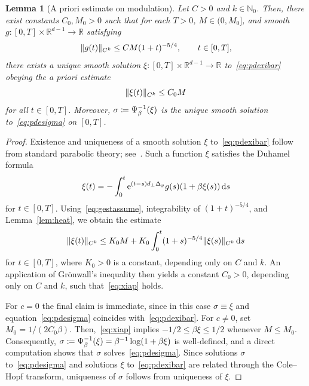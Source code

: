 \documentclass[12pt,oneside,a4paper,reqno]{amsart}
\numberwithin{equation}{section}
\newtheorem{lemma}[theorem]{Lemma}
\theoremstyle{definition}
\theoremstyle{remark}
\newcommand{\bbN}{{\mathbb N}}
\newcommand{\bbR}{{\mathbb R}}
\newcommand{\rd}{{\,\rm{d}}}
\newcommand{\re}{{\rm e}}
\DeclarePairedDelimiter{\norm}{\lVert}{\rVert}
\begin{document}
\begin{lemma}[A priori estimate on modulation]
    \label{lem:xiAP}
Let $C > 0$ and $k \in \bbN_0$. Then, there exist  constants $C_0, M_0 > 0$ such that for each $T > 0$, $M \in (0,M_0]$, and smooth $g \colon [0,T] \times \bbR^{d-1} \to \bbR$ satisfying
\begin{equation}
\label{eq:gestassume}
\norm{g(t)}_{C^k} \leq C M (1+t)^{-5/4}, \qquad t \in [0,T],
  \end{equation}
there exists a unique smooth solution $\xi \colon [0,T] \times \bbR^{d-1} \to \bbR$ to~\eqref{eq:pdexibar}
obeying the a priori estimate
\begin{equation}
\label{eq:xiap}
\norm{\xi(t)}_{C^k} \leq C_0 M
\end{equation}
for all $t \in [0,T]$. 
Moreover, $\sigma \coloneq \smash{\Psi_\beta^{-1}}(\xi)$
is the unique smooth solution to~\eqref{eq:pdesigma} on $[0,T]$.
\end{lemma}
\begin{proof}
Existence and uniqueness of a smooth solution $\xi$ to~\eqref{eq:pdexibar} follow from standard parabolic theory; see~\cite[Chapter~4]{Lunardi_analytic_2013}. Such a function $\xi$ satisfies the Duhamel formula
\begin{align}
    \label{eq:xiduhamellem}
    \xi(t) = -\int_0^t \re^{(t-s)d_{\bot}\Delta_y} g(s)(1+\beta\xi(s))\rd s
\end{align}
for $t \in [0,T]$. Using~\eqref{eq:gestassume}, integrability of $(1+t)^{-5/4}$, and Lemma~\ref{lem:heat}, we obtain the estimate
\begin{equation*}
    \norm{\xi(t)}_{C^k} \leq K_0 M + K_0 \int_0^t (1+s)^{-5/4} \norm{\xi(s)}_{C^k} \rd s
\end{equation*}
for $t \in [0,T]$, where $K_0 > 0$ is a constant, depending only on $C$ and $k$. An application of Gr\"onwall's inequality then yields a constant $C_0 > 0$, depending only on $C$ and $k$, such that~\eqref{eq:xiap} holds. 

For $c = 0$ the final claim is immediate, since in this case $\sigma \equiv \xi$ and equation~\eqref{eq:pdesigma} coincides with~\eqref{eq:pdexibar}. 
For $c \neq 0$, set $M_0 = 1/(2C_0\beta)$. Then,~\eqref{eq:xiap} implies $-1/2 \leq \beta\xi \leq 1/2$ whenever $M \leq M_0$. 
Consequently, $\sigma \coloneq \smash{\Psi_\beta^{-1}}(\xi) = \beta^{-1}\log(1+\beta\xi)$ is well-defined, and a direct computation shows that $\sigma$ solves~\eqref{eq:pdesigma}. Since solutions $\sigma$ to~\eqref{eq:pdesigma} and solutions $\xi$ to~\eqref{eq:pdexibar} are related through the Cole--Hopf transform, uniqueness of $\sigma$ follows from uniqueness of $\xi$.
\end{proof}
\end{document}
